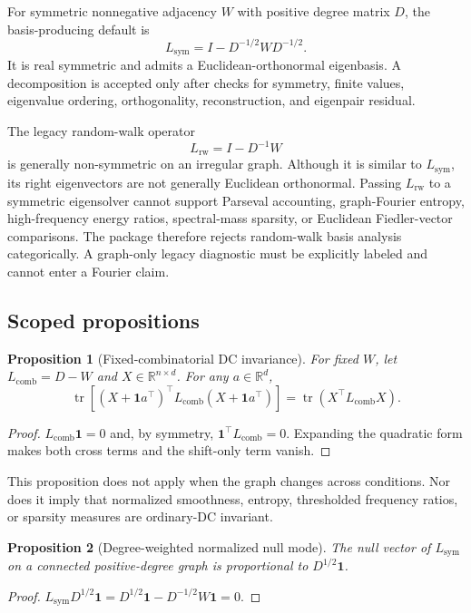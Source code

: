 \documentclass[10pt]{article}
\newcommand{\Lsym}{L_{\mathrm{sym}}}
\newcommand{\Lcomb}{L_{\mathrm{comb}}}
\newcommand{\Lrw}{L_{\mathrm{rw}}}
\newtheorem{proposition}{Proposition}
\begin{document}
For symmetric nonnegative adjacency $W$ with positive degree matrix $D$, the basis-producing default is
\begin{equation}
\Lsym = I - D^{-1/2} W D^{-1/2}.
\end{equation}
It is real symmetric and admits a Euclidean-orthonormal eigenbasis. A decomposition is accepted only after checks for symmetry, finite values, eigenvalue ordering, orthogonality, reconstruction, and eigenpair residual.

The legacy random-walk operator
\begin{equation}
\Lrw = I - D^{-1}W
\end{equation}
is generally non-symmetric on an irregular graph. Although it is similar to $\Lsym$, its right eigenvectors are not generally Euclidean orthonormal. Passing $\Lrw$ to a symmetric eigensolver cannot support Parseval accounting, graph-Fourier entropy, high-frequency energy ratios, spectral-mass sparsity, or Euclidean Fiedler-vector comparisons. The package therefore rejects random-walk basis analysis categorically. A graph-only legacy diagnostic must be explicitly labeled and cannot enter a Fourier claim.

\subsection{Scoped propositions}

\begin{proposition}[Fixed-combinatorial DC invariance]
For fixed $W$, let $\Lcomb=D-W$ and $X\in\mathbb{R}^{n\times d}$. For any $a\in\mathbb{R}^{d}$,
\begin{equation}
\operatorname{tr}\!\left[(X+\mathbf{1}a^\top)^\top\Lcomb(X+\mathbf{1}a^\top)\right]
=\operatorname{tr}(X^\top\Lcomb X).
\end{equation}
\end{proposition}
\begin{proof}
$\Lcomb\mathbf{1}=0$ and, by symmetry, $\mathbf{1}^\top\Lcomb=0$. Expanding the quadratic form makes both cross terms and the shift-only term vanish.
\end{proof}

This proposition does not apply when the graph changes across conditions. Nor does it imply that normalized smoothness, entropy, thresholded frequency ratios, or sparsity measures are ordinary-DC invariant.

\begin{proposition}[Degree-weighted normalized null mode]
The null vector of $\Lsym$ on a connected positive-degree graph is proportional to $D^{1/2}\mathbf{1}$.
\end{proposition}
\begin{proof}
$\Lsym D^{1/2}\mathbf{1}=D^{1/2}\mathbf{1}-D^{-1/2}W\mathbf{1}=0$.
\end{proof}
\end{document}
